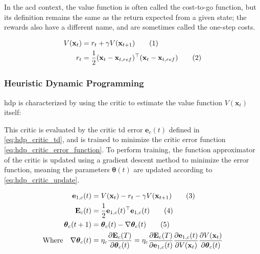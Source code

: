 \documentclass[../report.tex]{subfiles}
\begin{document}
In the \ac{acd} context, the value function is often called the cost-to-go function, but its definition remains the same as the return expected from a given state; the rewards also have a different name, and are sometimes called the one-step costs. 

\begin{align*}
    V(\mathbf{x}_t) &= r_t + \gamma V(\mathbf{x}_{t+1}) \stepcounter{equation}\tag{\theequation}\label{eq:acd_value_function}\\
    r_t &= \frac{1}{2}(\mathbf{x}_t - \mathbf{x}_{t, ref})^{\top}(\mathbf{x}_t - \mathbf{x}_{t, ref})\stepcounter{equation}\tag{\theequation}\label{eq:acd_reward}
\end{align*}
\subsubsection{Heuristic Dynamic Programming}

\ac{hdp} is characterized by using the critic to estimate the value function $V(\mathbf{x}_t)$ itself:

This critic is evaluated by the critic \ac{td} error $\mathbf{e}_c(t)$ defined in \autoref{eq:hdp_critic_td}, and is trained to minimize the critic error function \autoref{eq:hdp_critic_error_function}. To perform training, the function approximator of the critic is updated using a gradient descent method to minimize the error function, meaning the parameters $\boldsymbol{\theta}(t)$ are updated according to \autoref{eq:hdp_critic_update}.

\begin{align*}
    \mathbf{e}_{1,c}(t) &= V(\mathbf{x}_t) - r_t - \gamma V(\mathbf{x}_{t+1}) \stepcounter{equation}\tag{\theequation}\label{eq:hdp_critic_td}\\
    \mathbf{E}_c(t) &= \frac{1}{2}\mathbf{e}_{1,c}(t)^{\top}\mathbf{e}_{1,c}(t) \stepcounter{equation}\tag{\theequation}\label{eq:hdp_critic_error_function}\\
    \boldsymbol{\theta}_c(t+1) &= \boldsymbol{\theta}_c(t) - \nabla \boldsymbol{\theta}_c(t) \stepcounter{equation}\tag{\theequation}\label{eq:hdp_critic_update}\\
    \text{Where} \quad \nabla \boldsymbol{\theta}_c(t) &= \eta_c \frac{\partial \mathbf{E}_c(T)}{\partial \boldsymbol{\theta}_c(t)} = \eta_c \frac{\partial \mathbf{E}_c(T)}{\partial \mathbf{e}_{1,c}(t)}\frac{\partial \mathbf{e}_{1,c}(t)}{\partial V(\mathbf{x}_t)}\frac{\partial V(\mathbf{x}_t)}{\partial \boldsymbol{\theta}_c(t)}
\end{align*}
\end{document}
